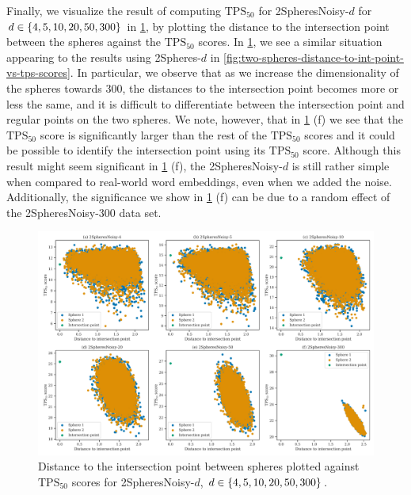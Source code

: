 Finally, we visualize the result of computing $\text{TPS}_{50}$ for 2SpheresNoisy-$d$ for $d \in \left\{4, 5, 10, 20, 50, 300\right\}$ in \cref{fig:two-spheres-noisy-distance-to-int-point-vs-tps-scores}, by plotting the distance to the intersection point between the spheres against the $\text{TPS}_{50}$ scores. In \cref{fig:two-spheres-noisy-distance-to-int-point-vs-tps-scores}, we see a similar situation appearing to the results using 2Spheres-$d$ in \cref{fig:two-spheres-distance-to-int-point-vs-tps-scores}. In particular, we observe that as we increase the dimensionality of the spheres towards 300, the distances to the intersection point becomes more or less the same, and it is difficult to differentiate between the intersection point and regular points on the two spheres. We note, however, that in \cref{fig:two-spheres-noisy-distance-to-int-point-vs-tps-scores} (f) we see that the $\text{TPS}_{50}$ score is significantly larger than the rest of the $\text{TPS}_{50}$ scores and it could be possible to identify the intersection point using its $\text{TPS}_{50}$ score. Although this result might seem significant in \cref{fig:two-spheres-noisy-distance-to-int-point-vs-tps-scores} (f), the 2SpheresNoisy-$d$ is still rather simple when compared to real-world word embeddings, even when we added the noise. Additionally, the significance we show in \cref{fig:two-spheres-noisy-distance-to-int-point-vs-tps-scores} (f) can be due to a random effect of the 2SpheresNoisy-300 data set.
\begin{figure}[H]
    \centering
    \includegraphics[width=\textwidth]{thesis/figures/two-spheres-noisy-distance-to-int-point-vs-tps-scores.pdf}
    \caption{Distance to the intersection point between spheres plotted against $\text{TPS}_{50}$ scores for 2SpheresNoisy-$d$, $d \in \left\{4, 5, 10, 20, 50, 300\right\}$.}
    \label{fig:two-spheres-noisy-distance-to-int-point-vs-tps-scores}
\end{figure}

